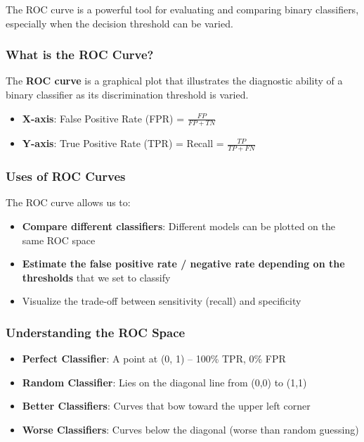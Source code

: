 \documentclass[11pt,a4paper]{article}
\theoremstyle{definition}
\theoremstyle{plain}
\theoremstyle{remark}
\begin{document}
The ROC curve is a powerful tool for evaluating and comparing binary classifiers, especially when the decision threshold can be varied.

\subsubsection{What is the ROC Curve?}

The \textbf{ROC curve} is a graphical plot that illustrates the diagnostic ability of a binary classifier as its discrimination threshold is varied.

\begin{itemize}
    \item \textbf{X-axis}: False Positive Rate (FPR) = $\frac{FP}{FP + TN}$
    \item \textbf{Y-axis}: True Positive Rate (TPR) = Recall = $\frac{TP}{TP + FN}$
\end{itemize}

\subsubsection{Uses of ROC Curves}

The ROC curve allows us to:
\begin{itemize}
    \item \textbf{Compare different classifiers}: Different models can be plotted on the same ROC space
    \item \textbf{Estimate the false positive rate / negative rate depending on the thresholds} that we set to classify
    \item Visualize the trade-off between sensitivity (recall) and specificity
\end{itemize}

\subsubsection{Understanding the ROC Space}

\begin{itemize}
    \item \textbf{Perfect Classifier}: A point at (0, 1) – 100\% TPR, 0\% FPR
    \item \textbf{Random Classifier}: Lies on the diagonal line from (0,0) to (1,1)
    \item \textbf{Better Classifiers}: Curves that bow toward the upper left corner
    \item \textbf{Worse Classifiers}: Curves below the diagonal (worse than random guessing)
\end{itemize}
\end{document}
